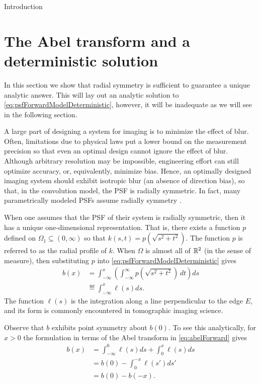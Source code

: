 \begin{chapter}{Introduction}
\section{The Abel transform and a deterministic solution}
  In this section we show that radial symmetry is sufficient to guarantee a unique analytic answer.
  This will lay out an analytic solution to \eqref{eq:psfForwardModelDeterministic}, however, it will be inadequate as we will see in the following section.

  A large part of designing a system for imaging is to minimize the effect of blur.
  Often, limitations due to physical laws put a lower bound on the measurement precision so that even an optimal design cannot ignore the effect of blur.
  Although arbitrary resolution may be impossible, engineering effort can still optimize accuracy, or, equivalently, minimize bias.
  Hence, an optimally designed imaging system should exhibit isotropic blur (an absence of direction bias), so that, in the convolution model, the PSF is radially symmetric.
  In fact, many parametrically modeled PSFs assume radially symmetry \citep{doering1992,jain1989,kundur1996blind,watson1993}.  

  When one assumes that the PSF of their system is radially symmetric, then it has a unique one-dimensional representation.
  That is, there exists a function $p$ defined on $\Omega_1 \subseteq (0,\infty)$ so that $k(s,t) = p\left(\sqrt{s^2 + t^2}\right)$.  
  The function $p$ is referred to as the radial profile of $k$.
  When $\Omega$ is almost all of $\mathbb R^2$ (in the sense of measure), then substituting $p$ into \eqref{eq:psfForwardModelDeterministic} gives
  \begin{align}
    b(x) &= \int_{-\infty}^x \left(\int_{-\infty}^\infty p\left(\sqrt{s^2 + t^2}\right)\,dt\right)ds \nonumber \\
         &\eqdef \int_{-\infty}^x \ell(s)ds. \label{eq:abelForward}
  \end{align}
  The function $\ell(s)$ is the integration along a line perpendicular to the edge $E$, and its form is commonly encountered in tomographic imaging science.

  Observe that $b$ exhibits point symmetry about $b(0)$.
  To see this analytically, for $x>0$ the formulation in terms of the Abel transform in \eqref{eq:abelForward} gives
  \begin{align}
    b(x) &= \int_{-\infty}^0 \ell(s)ds + \int_0^x \ell(s)ds \nonumber \\
         &= b(0) - \int_0^{-x}\ell(s')ds'  \nonumber \\
         &= b(0) - b(-x).
  \end{align}


\end{chapter}
